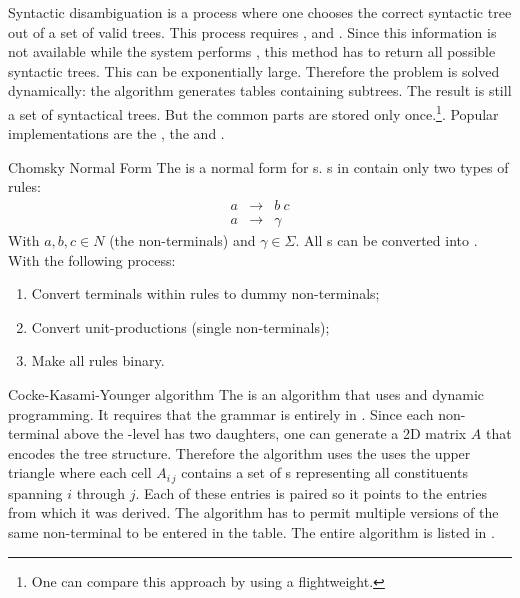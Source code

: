 \begin{df}{Syntactic disambiguation}
\sb{} is a process where one chooses the correct syntactic tree out of a set of valid trees. This process requires ,  and . Since this information is not available while the system performs , this method has to return all possible syntactic trees. This can be exponentially large. Therefore the problem is solved dynamically: the algorithm generates tables containing subtrees. The result is still a set of syntactical trees. But the common parts are stored only once.\footnote{One can compare this approach by using a flightweight.}. Popular implementations are the , the  and .
\end{df}
\begin{df}[CNF]{Chomsky Normal Form}
The \sb{} is a normal form for s. s in \sb{} contain only two types of rules:
\begin{eqnarray}
a&\rightarrow&b\ c\\
a&\rightarrow&\gamma
\end{eqnarray}
With $a,b,c\in N$ (the non-terminals) and $\gamma\in\Sigma$. All s can be converted into \sb{}. With the following process:
\begin{enumerate}
 \item Convert terminals within rules to dummy non-terminals;
 \item Convert unit-productions (single non-terminals);
 \item Make all rules binary.
\end{enumerate}
\end{df}
\begin{df}[CKY]{Cocke-Kasami-Younger algorithm}
The \sb{} is an algorithm that uses  and dynamic programming. It requires that the grammar is entirely in . Since each non-terminal above the -level has two daughters, one can generate a 2D matrix $A$ that encodes the tree structure. Therefore the algorithm uses the uses the upper triangle where each cell $A_{i\,j}$ contains a set of s representing all constituents spanning $i$ through $j$. Each of these entries is paired so it points to the entries from which it was derived. The algorithm has to permit multiple versions of the same non-terminal to be entered in the table. The entire algorithm is listed in .
\end{df}
